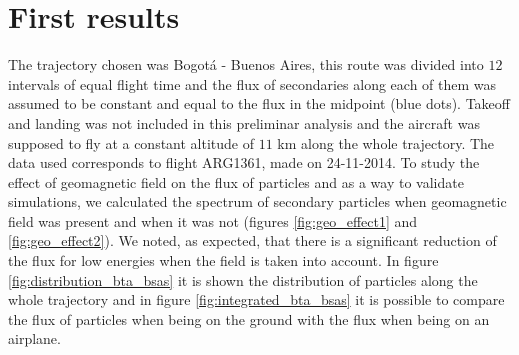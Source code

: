 \documentclass[3p,times,twocolumn]{elsarticle}
\begin{document}
\section{First results}
\label{sec:first_results}
The trajectory chosen was Bogot\'a - Buenos Aires, this route was divided into $12$ intervals of equal flight time and the flux of secondaries along each of them was assumed to be constant and equal to the flux in the midpoint (blue dots). Takeoff and landing was not included in this preliminar analysis and the aircraft was supposed to fly at a constant altitude of $11$ km along the whole trajectory. The data used corresponds to flight ARG1361, made on 24-11-2014. To study the effect of geomagnetic field on the flux of particles and as a way to validate simulations, we calculated the spectrum of secondary particles when geomagnetic field was present and when it was not (figures \ref{fig:geo_effect1} and \ref{fig:geo_effect2}). We noted, as expected, that there is a significant reduction of the flux for low energies when the field is taken into account. In figure \ref{fig:distribution_bta_bsas} it is shown the distribution of particles along the whole trajectory and in figure \ref{fig:integrated_bta_bsas} it is possible to compare the flux of particles when being on the ground with the flux when being on an airplane.

\end{document}
